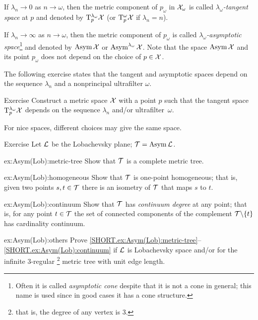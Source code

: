 If $\lambda_n\to 0$ as $n\to\omega$, then the metric component of $p_\omega$ in $\mathcal{X}_\omega$ is called \emph{$\lambda_\omega$-tangent space} at $p$ and denoted by $\mathrm{T}_p^{\lambda_\omega}\mathcal{X}$ (or $\mathrm{T}_p^{\omega}\mathcal{X}$ if $\lambda_n=n$).\label{page:ultratangent space}

If $\lambda_n\to \infty$ as $n\to\omega$, then the metric component of $p_\omega$ is called \emph{$\lambda_\omega$-asymptotic space}\footnote{Often it is called \emph{asymptotic cone} despite that it is not a cone in general; this name is used since in good cases it has a cone structure.} and denoted by $\mathop{\rm Asym}\nolimits\mathcal{X}$ or $\mathop{\rm Asym}\nolimits^{\lambda_\omega}\mathcal{X}$.
Note that the space $\mathop{\rm Asym}\nolimits\mathcal{X}$ and its point $p_\omega$ does not depend on the choice of $p\in \mathcal{X}$.

The following exercise states that the tangent and asymptotic spaces depend on the sequence $\lambda_n$ and a nonprincipal ultrafilter $\omega$.

\begin{thm}{Exercise}\label{ex:ultraT}
Construct a metric space $\mathcal{X}$ with a point $p$ such that the tangent space
$\mathrm{T}_p^{\lambda_\omega}\mathcal{X}$ depends on the sequence $\lambda_n$ and/or ultrafilter~$\omega$.
\end{thm}

For nice spaces, different choices may give the same space.

\begin{thm}{Exercise}\label{ex:Asym(Lob)}
Let $\mathcal{L}$ be the Lobachevsky plane; $\mathcal{T}=\mathop{\rm Asym}\nolimits\mathcal{L}$.

\begin{subthm}{ex:Asym(Lob):metric-tree}
Show that $\mathcal{T}$ is a complete metric tree.
\end{subthm}

\begin{subthm}{ex:Asym(Lob):homogeneous}
Show that $\mathcal{T}$ is one-point homogeneous; that is, given two points $s,t\in \mathcal{T}$ there is an isometry of $\mathcal{T}$ that maps $s$ to $t$.
\end{subthm}

\begin{subthm}{ex:Asym(Lob):continuum}
Show that $\mathcal{T}$ has {}\emph{continuum degree} at any point;
that is, for any point $t\in \mathcal{T}$ the set of connected components of the complement $\mathcal{T}\backslash\{t\}$ has cardinality continuum.
\end{subthm}

\begin{subthm}{ex:Asym(Lob):others}
Prove \ref{SHORT.ex:Asym(Lob):metric-tree}--\ref{SHORT.ex:Asym(Lob):continuum} if $\mathcal{L}$ is Lobachevsky space and/or for the infinite 3-regular%
\footnote{that is, the degree of any vertex is 3.}
metric tree with unit edge length. 
\end{subthm}

\end{thm}




